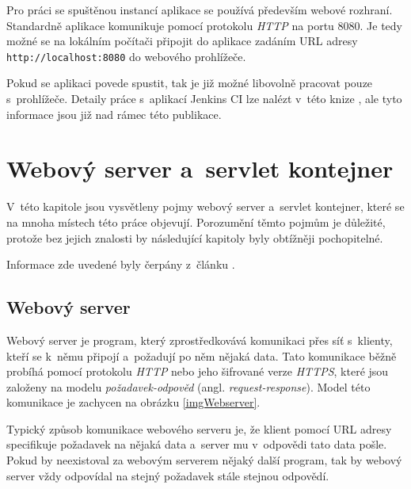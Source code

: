             Pro práci se spuštěnou instancí aplikace se používá především webové rozhraní. Standardně aplikace
            komunikuje pomocí protokolu \emph{HTTP} na portu 8080. Je tedy možné se na lokálním počítači připojit do aplikace zadáním URL adresy 
            \texttt{http://localhost:8080} do webového prohlížeče. 

            Pokud se aplikaci povede spustit, tak je již možné libovolně pracovat pouze s~prohlížeče. Detaily práce s~aplikací Jenkins CI
            lze nalézt v~této knize \cite{jenkinsBook}, ale tyto informace jsou již nad rámec této publikace.


            
       
    \section{Webový server a~servlet kontejner} \label{servletWebserver}
        V~této kapitole jsou vysvětleny pojmy webový server a~servlet kontejner, které se 
        na mnoha místech této práce objevují. Porozumění těmto pojmům je důležité, protože bez
        jejich znalosti by následující kapitoly byly obtížněji pochopitelné.
        
        Informace zde uvedené byly čerpány z~článku \cite{webserverVsServletPage}.

        \subsection{Webový server}
            Webový server je program, který zprostředkovává komunikaci přes síť s~klienty, kteří
            se k~němu připojí a~požadují po něm nějaká data. Tato komunikace běžně probíhá pomocí protokolu \emph{HTTP}
            nebo jeho šifrované verze \emph{HTTPS},
            které jsou založeny na modelu \emph{požadavek-odpověd} (angl. \emph{request-response}).
            Model této komunikace je zachycen na obrázku \ref{imgWebserver}.
            
            Typický způsob komunikace webového serveru je, 
            že klient pomocí URL adresy specifikuje požadavek na nějaká
            data a~server mu v~odpovědi tato data pošle. Pokud by neexistoval za webovým serverem nějaký další
            program, tak by webový server vždy odpovídal na stejný požadavek stále stejnou odpovědí.

